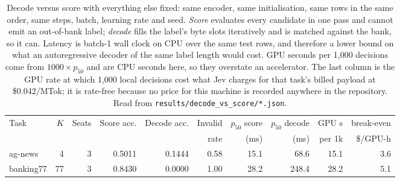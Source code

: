 \begin{table}[htbp]
\centering
\footnotesize
\caption{Decode versus score with everything else fixed: same encoder, same
initialisation, same rows in the same order, same steps, batch, learning rate
and seed. \emph{Score} evaluates every candidate in one pass and cannot emit an
out-of-bank label; \emph{decode} fills the label's byte slots iteratively and is
matched against the bank, so it can. Latency is batch-1 wall clock on CPU over
the same test rows, and therefore a lower bound on what an autoregressive
decoder of the same label length would cost. GPU seconds per 1,000 decisions
come from $1000\times p_{50}$ and are CPU seconds here, so they overstate an
accelerator. The last column is the GPU rate at which 1,000 local decisions
cost what Jev charges for that task's billed payload at \$0.042/MTok; it is rate-free
because no price for this machine is recorded anywhere in the repository. Read
from \texttt{results/decode\_vs\_score/*.json}.}
\label{tab:comparator}
\setlength{\tabcolsep}{4pt}
\begin{tabular}{lrrrrrrrrr}
\toprule
Task & $K$ & Seats & Score acc. & Decode acc. & Invalid & $p_{50}$ score & $p_{50}$ decode & GPU s & break-even \\
 & & & & & rate & (ms) & (ms) & per 1k & \$/GPU-h \\
\midrule
ag-news & 4 & 3 & 0.5011 & 0.1444 & 0.58 & 15.1 & 68.6 & 15.1 & 3.6 \\
banking77 & 77 & 3 & 0.8430 & 0.0000 & 1.00 & 28.2 & 248.4 & 28.2 & 5.1 \\

\bottomrule
\end{tabular}
\end{table}
